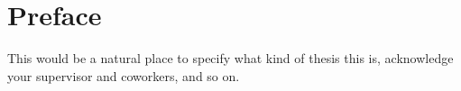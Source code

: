 \chapter*{Preface}\noindent
This would be a natural place to specify what kind of thesis this is, acknowledge your supervisor and coworkers, and so on.
